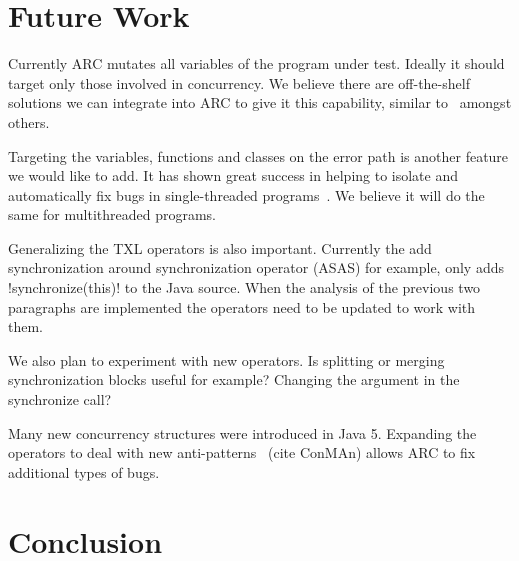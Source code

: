\documentclass[10pt, conference, compsocconf]{IEEEtran}
\begin{document}
\section{Future Work}

Currently ARC mutates all variables of the program under test. Ideally it should target only those involved in concurrency. We believe there are off-the-shelf solutions we can integrate into ARC to give it this capability, similar to~\cite{CM08, HP00} amongst others.  

Targeting the variables, functions and classes on the error path is another feature we would like to add.  It has shown great success in helping to isolate and automatically fix bugs in single-threaded programs~\cite{FNWG09, NWLF09, WFGN10, GNFW11}. We believe it will do the same for multithreaded programs.

Generalizing the TXL operators is also important. Currently the add synchronization around synchronization operator (ASAS) for example, only adds !synchronize(this)! to the Java source.  When the analysis of the previous two paragraphs are implemented the operators need to be updated to work with them.

We also plan to experiment with new operators.  Is splitting or merging synchronization blocks useful for example? Changing the argument in the synchronize call?  

Many new concurrency structures were introduced in Java 5. Expanding the operators to deal with new anti-patterns~\cite{BJ09} (cite ConMAn) allows ARC to fix additional types of bugs.  

\section{Conclusion}
\end{document}
